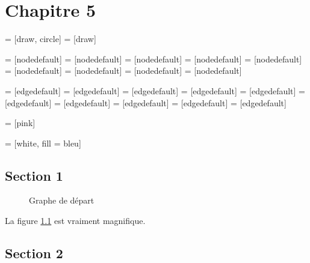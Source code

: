 
\chapter{Chapitre 5}



 = [draw, circle]
 = [draw]

 = [nodedefault]
 = [nodedefault]
 = [nodedefault]
 = [nodedefault]
 = [nodedefault]
 = [nodedefault]
 = [nodedefault]
 = [nodedefault]
 = [nodedefault]

 = [edgedefault]
 = [edgedefault]
 = [edgedefault]
 = [edgedefault]
 = [edgedefault]
 = [edgedefault]
 = [edgedefault]
 = [edgedefault]
 = [edgedefault]
 = [edgedefault]

 = [pink]

 = [white, fill = bleu]

\section{Section 1}

\begin{figure}
  \centering

  \begin{tikzpicture}[every node/.style = {nodedefault}, every path/.style = {edgedefault}]
    
  \end{tikzpicture}

  \caption{Graphe de départ}
  \label{fig:graphe}
\end{figure}

La figure \ref{fig:graphe} est vraiment magnifique.

\section{Section 2}

